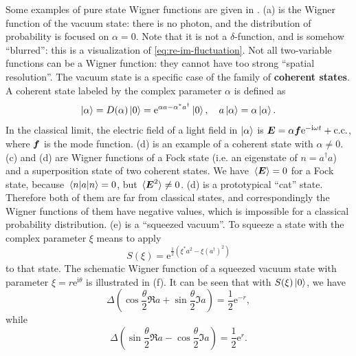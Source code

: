 \documentclass[hyperref, a4paper]{article}
\newcommand*{\ii}{\mathrm{i}}
\newcommand*{\ee}{\mathrm{e}}
\newcommand*{\concept}[1]{{\textbf{#1}}}
\begin{document}
Some examples of pure state Wigner functions are given in .
(a) is the Wigner function of the vacuum state:
there is no photon, 
and the distribution of probability is focused on $\alpha = 0$.
Note that it is not a $\delta$-function,
and is somehow ``blurred'':
this is a visualization of \eqref{eq:re-im-fluctuation}.
Not all two-variable functions can be a Wigner function:
they cannot have too strong ``spatial resolution''.
The vacuum state is a specific case of the family of \concept{coherent states}.
A coherent state labeled by the complex parameter $\alpha$ is defined as 
\begin{equation}
    \ket{\alpha} = D(\alpha) \ket{0} = \ee^{\alpha a - \alpha^* a^\dagger} \ket{0},
    \quad a \ket{\alpha} = \alpha \ket{\alpha}.
\end{equation}
In the classical limit, 
the electric field of a light field in $\ket{\alpha}$
is $\vb*{E} = \alpha \vb*{f} \ee^{- \ii \omega t} + \text{c.c.}$,
where $\vb*{f}$ is the mode function.
(d) is an example of a coherent state with $\alpha \neq 0$.
(c) and (d) 
are Wigner functions of a Fock state (i.e. an eigenstate of $n = a^\dagger a$)
and a superposition state of two coherent states.
We have $\expval*{\vb*{E}} = 0$ for a Fock state,
because $\expval*{a}{n} = 0$,
but $\expval*{\vb*{E}^2} \neq 0$.
(d) is a prototypical ``cat'' state.
Therefore both of them are far from classical states,
and correspondingly the Wigner functions of them have negative values,
which is impossible for a classical probability distribution.
(e) is a ``squeezed vacuum''.
To squeeze a state with the complex parameter $\xi$ means to apply 
\begin{equation}
    S(\xi) = \ee^{\frac{1}{2} (\xi^* a^2 - \xi (a^\dagger)^2)}
\end{equation}
to that state.
The schematic Wigner function of a squeezed vacuum state 
with parameter $\xi = r \ee^{\ii \theta}$
is illustrated in (f).
It can be seen that with $S(\xi) \ket{0}$, 
we have \cite{scully1999quantum}
\begin{equation}
    \Delta \left( \cos \frac{\theta}{2} \Re a  + \sin \frac{\theta}{2} \Im a \right)  = \frac{1}{2} \ee^{-r},
    \label{eq:min-op-squeeze}
\end{equation} 
while 
\begin{equation}
    \Delta \left( \sin \frac{\theta}{2} \Re a - \cos \frac{\theta}{2} \Im a \right) = \frac{1}{2} \ee^{r}.
\end{equation}
\end{document}
